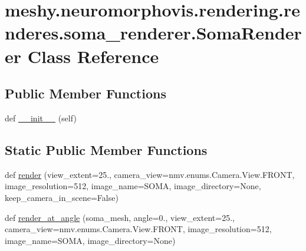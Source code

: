 \hypertarget{classmeshy_1_1neuromorphovis_1_1rendering_1_1renderes_1_1soma__renderer_1_1SomaRenderer}{}\section{meshy.\+neuromorphovis.\+rendering.\+renderes.\+soma\+\_\+renderer.\+Soma\+Renderer Class Reference}
\label{classmeshy_1_1neuromorphovis_1_1rendering_1_1renderes_1_1soma__renderer_1_1SomaRenderer}


 


\subsection*{Public Member Functions}
\begin{DoxyCompactItemize}
\item 
def \hyperlink{classmeshy_1_1neuromorphovis_1_1rendering_1_1renderes_1_1soma__renderer_1_1SomaRenderer_af32f54f1c7677a6a6d09076a568f9fb3}{\+\_\+\+\_\+init\+\_\+\+\_\+} (self)\hypertarget{classmeshy_1_1neuromorphovis_1_1rendering_1_1renderes_1_1soma__renderer_1_1SomaRenderer_af32f54f1c7677a6a6d09076a568f9fb3}{}\label{classmeshy_1_1neuromorphovis_1_1rendering_1_1renderes_1_1soma__renderer_1_1SomaRenderer_af32f54f1c7677a6a6d09076a568f9fb3}

\end{DoxyCompactItemize}
\subsection*{Static Public Member Functions}
\begin{DoxyCompactItemize}
\item 
def \hyperlink{classmeshy_1_1neuromorphovis_1_1rendering_1_1renderes_1_1soma__renderer_1_1SomaRenderer_ac02798b8144c92a004ecdc01dc0bfd90}{render} (view\+\_\+extent=25., camera\+\_\+view=nmv.\+enums.\+Camera.\+View.\+F\+R\+O\+NT, image\+\_\+resolution=512, image\+\_\+name=\textquotesingle{}S\+O\+MA\textquotesingle{}, image\+\_\+directory=None, keep\+\_\+camera\+\_\+in\+\_\+scene=False)
\item 
def \hyperlink{classmeshy_1_1neuromorphovis_1_1rendering_1_1renderes_1_1soma__renderer_1_1SomaRenderer_adfe2b9df2f2c9bab95a31500c4438027}{render\+\_\+at\+\_\+angle} (soma\+\_\+mesh, angle=0., view\+\_\+extent=25., camera\+\_\+view=nmv.\+enums.\+Camera.\+View.\+F\+R\+O\+NT, image\+\_\+resolution=512, image\+\_\+name=\textquotesingle{}S\+O\+MA\textquotesingle{}, image\+\_\+directory=None)
\end{DoxyCompactItemize}


